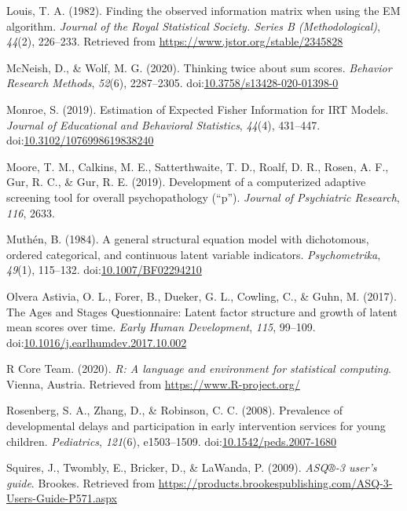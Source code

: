 \documentclass[
  11pt,
]{article}
\newlength{\cslhangindent}
\newlength{\cslentryspacingunit} %
\newenvironment{CSLReferences}[2] %
 {%
  \setlength{\parindent}{0pt}
  \ifodd #1
  \let\oldpar\par
  \def\par{\hangindent=\cslhangindent\oldpar}
  \fi
  \setlength{\parskip}{#2\cslentryspacingunit}
 }%
 {}
\begin{document}
\begin{CSLReferences}{1}{0}
\leavevmode{}%
Louis, T. A. (1982). Finding the observed information matrix when using
the EM algorithm. \emph{Journal of the Royal Statistical Society. Series
B (Methodological)}, \emph{44}(2), 226--233. Retrieved from
\url{https://www.jstor.org/stable/2345828}

\leavevmode{}%
McNeish, D., \& Wolf, M. G. (2020). Thinking twice about sum scores.
\emph{Behavior Research Methods}, \emph{52}(6), 2287--2305.
doi:\href{https://doi.org/10.3758/s13428-020-01398-0}{10.3758/s13428-020-01398-0}

\leavevmode{}%
Monroe, S. (2019). Estimation of Expected Fisher Information for IRT
Models. \emph{Journal of Educational and Behavioral Statistics},
\emph{44}(4), 431--447.
doi:\href{https://doi.org/10.3102/1076998619838240}{10.3102/1076998619838240}

\leavevmode{}%
Moore, T. M., Calkins, M. E., Satterthwaite, T. D., Roalf, D. R., Rosen,
A. F., Gur, R. C., \& Gur, R. E. (2019). Development of a computerized
adaptive screening tool for overall psychopathology ({``}p{''}).
\emph{Journal of Psychiatric Research}, \emph{116}, 2633.

\leavevmode{}%
Muthén, B. (1984). A general structural equation model with dichotomous,
ordered categorical, and continuous latent variable indicators.
\emph{Psychometrika}, \emph{49}(1), 115--132.
doi:\href{https://doi.org/10.1007/BF02294210}{10.1007/BF02294210}

\leavevmode{}%
Olvera Astivia, O. L., Forer, B., Dueker, G. L., Cowling, C., \& Guhn,
M. (2017). The Ages and Stages Questionnaire: Latent factor structure
and growth of latent mean scores over time. \emph{Early Human
Development}, \emph{115}, 99--109.
doi:\href{https://doi.org/10.1016/j.earlhumdev.2017.10.002}{10.1016/j.earlhumdev.2017.10.002}

\leavevmode{}%
R Core Team. (2020). \emph{R: A language and environment for statistical
computing}. Vienna, Austria. Retrieved from
\url{https://www.R-project.org/}

\leavevmode{}%
Rosenberg, S. A., Zhang, D., \& Robinson, C. C. (2008). Prevalence of
developmental delays and participation in early intervention services
for young children. \emph{Pediatrics}, \emph{121}(6), e1503--1509.
doi:\href{https://doi.org/10.1542/peds.2007-1680}{10.1542/peds.2007-1680}

\leavevmode{}%
Squires, J., Twombly, E., Bricker, D., \& LaWanda, P. (2009).
\emph{ASQ®-3 user's guide}. Brookes. Retrieved from
\url{https://products.brookespublishing.com/ASQ-3-Users-Guide-P571.aspx}

\end{CSLReferences}
\end{document}
